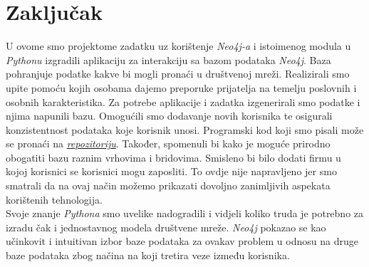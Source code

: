 \documentclass[titlepage, 12pt]{scrartcl}
\begin{document}
	\section{Zaključak}
	U ovome smo projektome zadatku uz korištenje \emph{Neo4j-a} i istoimenog modula u \emph{Pythonu} izgradili aplikaciju za interakciju sa bazom podataka \emph{Neo4j}. Baza pohranjuje podatke kakve bi mogli pronaći u društvenoj mreži. Realizirali smo upite pomoću kojih osobama dajemo preporuke  prijatelja na temelju poslovnih i osobnih karakteristika. Za potrebe aplikacije i zadatka izgenerirali smo podatke i njima napunili bazu. Omogućili smo dodavanje novih korisnika te osigurali konzistentnost podataka koje korisnik unosi. Programski kod koji smo pisali može se pronaći na \href{https://github.com/basioli-k/social_network}{\emph{repozitoriju}}. Također, spomenuli bi kako je moguće prirodno obogatiti bazu raznim vrhovima i bridovima. Smisleno bi bilo dodati firmu u kojoj korisnici se korisnici mogu zaposliti. To ovdje nije napravljeno jer smo smatrali da na ovaj način možemo prikazati dovoljno zanimljivih aspekata korištenih tehnologija. \\
	Svoje znanje \emph{Pythona} smo uvelike nadogradili i vidjeli koliko truda je potrebno za izradu čak i jednostavnog modela društvene mreže. \emph{Neo4j} pokazao se kao učinkovit i intuitivan izbor baze podataka za ovakav problem u odnosu na druge baze podataka zbog načina na koji tretira veze između korisnika. 
	
	
	\newpage
	\nocite{*}
    \printbibliography
\end{document}
